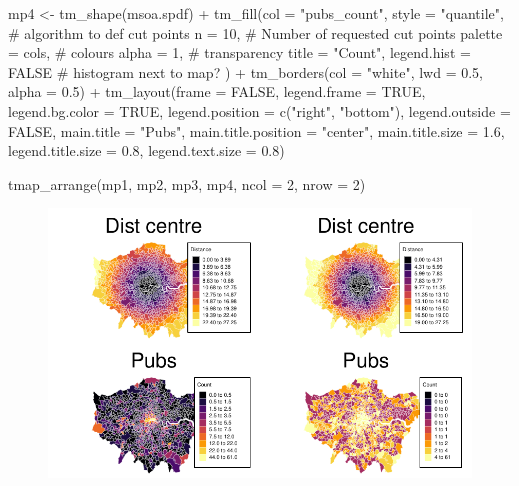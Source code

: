 \documentclass[
  letterpaper,
]{scrbook}
\newenvironment{Shaded}{\begin{snugshade}}{\end{snugshade}}
\newcommand{\AttributeTok}[1]{\textcolor[rgb]{0.40,0.45,0.13}{#1}}
\newcommand{\CommentTok}[1]{\textcolor[rgb]{0.37,0.37,0.37}{#1}}
\newcommand{\ConstantTok}[1]{\textcolor[rgb]{0.56,0.35,0.01}{#1}}
\newcommand{\DecValTok}[1]{\textcolor[rgb]{0.68,0.00,0.00}{#1}}
\newcommand{\FloatTok}[1]{\textcolor[rgb]{0.68,0.00,0.00}{#1}}
\newcommand{\FunctionTok}[1]{\textcolor[rgb]{0.28,0.35,0.67}{#1}}
\newcommand{\NormalTok}[1]{\textcolor[rgb]{0.00,0.23,0.31}{#1}}
\newcommand{\OtherTok}[1]{\textcolor[rgb]{0.00,0.23,0.31}{#1}}
\newcommand{\SpecialCharTok}[1]{\textcolor[rgb]{0.37,0.37,0.37}{#1}}
\newcommand{\StringTok}[1]{\textcolor[rgb]{0.13,0.47,0.30}{#1}}
\begin{document}
\begin{Shaded}
\begin{Highlighting}[]
\NormalTok{mp4 }\OtherTok{\textless{}{-}}  \FunctionTok{tm\_shape}\NormalTok{(msoa.spdf) }\SpecialCharTok{+} 
  \FunctionTok{tm\_fill}\NormalTok{(}\AttributeTok{col =} \StringTok{"pubs\_count"}\NormalTok{, }
          \AttributeTok{style =} \StringTok{"quantile"}\NormalTok{, }\CommentTok{\# algorithm to def cut points}
          \AttributeTok{n =} \DecValTok{10}\NormalTok{, }\CommentTok{\# Number of requested cut points}
          \AttributeTok{palette =}\NormalTok{ cols, }\CommentTok{\# colours}
          \AttributeTok{alpha =} \DecValTok{1}\NormalTok{, }\CommentTok{\# transparency }
          \AttributeTok{title =} \StringTok{"Count"}\NormalTok{, }
          \AttributeTok{legend.hist =} \ConstantTok{FALSE} \CommentTok{\# histogram next to map?}
\NormalTok{          ) }\SpecialCharTok{+}
  \FunctionTok{tm\_borders}\NormalTok{(}\AttributeTok{col =} \StringTok{"white"}\NormalTok{, }\AttributeTok{lwd =} \FloatTok{0.5}\NormalTok{, }\AttributeTok{alpha =} \FloatTok{0.5}\NormalTok{) }\SpecialCharTok{+}
  \FunctionTok{tm\_layout}\NormalTok{(}\AttributeTok{frame =} \ConstantTok{FALSE}\NormalTok{,}
            \AttributeTok{legend.frame =} \ConstantTok{TRUE}\NormalTok{, }\AttributeTok{legend.bg.color =} \ConstantTok{TRUE}\NormalTok{,}
            \AttributeTok{legend.position =} \FunctionTok{c}\NormalTok{(}\StringTok{"right"}\NormalTok{, }\StringTok{"bottom"}\NormalTok{),}
            \AttributeTok{legend.outside =} \ConstantTok{FALSE}\NormalTok{,}
            \AttributeTok{main.title =} \StringTok{"Pubs"}\NormalTok{, }
            \AttributeTok{main.title.position =} \StringTok{"center"}\NormalTok{,}
            \AttributeTok{main.title.size =} \FloatTok{1.6}\NormalTok{,}
            \AttributeTok{legend.title.size =} \FloatTok{0.8}\NormalTok{,}
            \AttributeTok{legend.text.size =} \FloatTok{0.8}\NormalTok{)}


\FunctionTok{tmap\_arrange}\NormalTok{(mp1, mp2, mp3, mp4, }\AttributeTok{ncol =} \DecValTok{2}\NormalTok{, }\AttributeTok{nrow =} \DecValTok{2}\NormalTok{)}
\end{Highlighting}
\end{Shaded}

\begin{figure}[H]

{\centering \includegraphics{02_spatial-data_files/figure-pdf/unnamed-chunk-27-1.pdf}

}

\end{figure}
\end{document}
